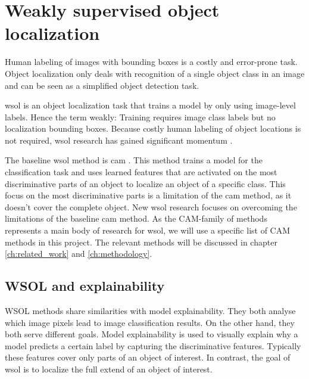 \section{Weakly supervised object localization}
Human labeling of images with bounding boxes is a costly and error-prone task. Object localization only deals with recognition of a single object class in an image and can be seen as a simplified object detection task. 

\acrshort{wsol} is an object localization task that trains a model by only using image-level labels. Hence the term weakly: Training requires image class labels but no localization bounding boxes. Because costly human labeling of object locations is not required, \acrshort{wsol} research has gained significant momentum \cite{zhou2016cvpr, selvaraju2017grad, chattopadhay2018grad, wang2021minmaxcam, wang2020score, choe2020evaluating}.

The baseline \acrshort{wsol} method is \acrfull{cam} \cite{zhou2016cvpr}. This method trains a model for the classification task and uses learned features that are activated on the most discriminative parts of an object to localize an object of a specific class. This focus on the most discriminative parts is a limitation of the \acrshort{cam} method, as it doesn't cover the complete object. New \acrshort{wsol} research \cite{selvaraju2017grad, chattopadhay2018grad, wang2021minmaxcam, wang2020score, choe2020evaluating} focuses on overcoming the limitations of the baseline \acrshort{cam} method. As the CAM-family of methods represents a main body of research for \acrlong{wsol}, we will use a specific list of CAM methods in this project. The relevant methods will be discussed in chapter \ref{ch:related_work} and \ref{ch:methodology}. 

\subsection{WSOL and explainability}
WSOL methods share similarities with model explainability. They both analyse which image pixels lead to image classification results. On the other hand, they both serve different goals.
Model explainability is used to visually explain why a model predicts a certain label by capturing the discriminative features. Typically these features cover only parts of an object of interest. In contrast, the goal of \acrshort{wsol} is to localize the full extend of an object of interest.


